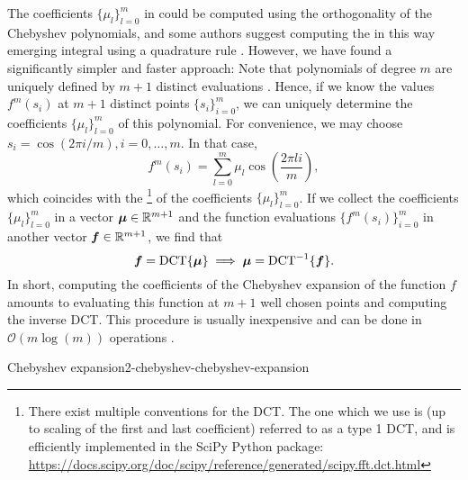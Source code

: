 The coefficients $\{\mu_l\}_{l=0}^m$ in 
could be computed using the orthogonality of the Chebyshev polynomials, and some
authors suggest computing the in this way emerging integral using a quadrature
rule \cite[algorithm~1]{lin2017randomized}. However, we
have found a significantly simpler and faster approach: Note that polynomials of
degree $m$ are uniquely defined by $m+1$ distinct evaluations \cite{gauss1799demonstratio}.
Hence, if we know the values $f^m(s_i)$ at $m+1$ distinct points 
$\{s_i\}_{i=0}^m$, we can uniquely determine the coefficients $\{\mu_l\}_{l=0}^m$
of this polynomial. For convenience, we may choose $s_i = \cos(2 \pi i/m), i=0,\dots,m$.
In that case,
\begin{equation}
    f^m(s_i) = \sum_{l=0}^{m} \mu_l \cos\left(\frac{2 \pi l i}{m}\right),
    \label{equ:2-chebyshev-chebyshev-nodes-evaluation}
\end{equation}
which coincides with the \footnote{There exist multiple conventions for the DCT.
The one which we use is (up to scaling of the first and last coefficient)
referred to as a type 1 DCT, and is efficiently implemented in the SciPy Python package:
\url{https://docs.scipy.org/doc/scipy/reference/generated/scipy.fft.dct.html}} of the coefficients $\{\mu_l\}_{l=0}^m$.
If we collect the coefficients $\{\mu_l\}_{l=0}^{m}$ in a vector $\boldsymbol{\mu} \in \mathbb{R}^{m+1}$ 
and the function evaluations $\{f^m(s_i)\}_{i=0}^{m}$ in another
vector $\boldsymbol{f} \in \mathbb{R}^{m+1}$, we find that
\begin{equation}
    \boldsymbol{f} = \operatorname{DCT} \{ \boldsymbol{\mu} \} \implies \boldsymbol{\mu} = \operatorname{DCT}^{-1}\{ \boldsymbol{f} \}.
    \label{equ:2-chebyshev-chebyshev-DCT}
\end{equation}
In short, computing the coefficients of the Chebyshev expansion 
of the function $f$ amounts to evaluating this function at $m+1$ well
chosen points and computing the inverse \gls{DCT}.
This procedure is usually inexpensive and can be done in $\mathcal{O}(m \log(m))$
operations \cite{makhoul1980fct}.\\

\begin{algo}{Chebyshev expansion}{2-chebyshev-chebyshev-expansion}
    
\end{algo}


